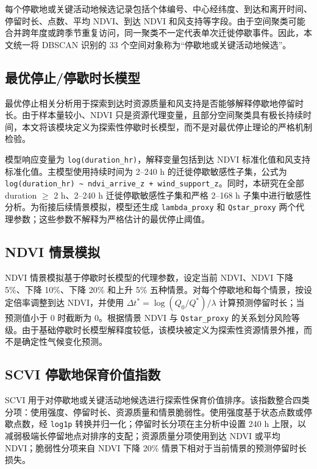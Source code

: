 \documentclass[UTF8,a4paper,12pt]{ctexart}
\begin{document}
每个停歇地或关键活动地候选记录包括个体编号、中心经纬度、到达和离开时间、停留时长、点数、平均 NDVI、到达 NDVI 和风支持等字段。由于空间聚类可能合并跨年度或跨季节重复访问，同一聚类不一定代表单次迁徙停歇事件。因此，本文统一将 DBSCAN 识别的 33 个空间对象称为“停歇地或关键活动地候选”。

\subsection{最优停止/停歇时长模型}

最优停止相关分析用于探索到达时资源质量和风支持是否能够解释停歇地停留时长。由于样本量较小、NDVI 只是资源代理变量，且部分空间聚类具有极长持续时间，本文将该模块定义为探索性停歇时长模型，而不是对最优停止理论的严格机制检验。

模型响应变量为 \texttt{log(duration\_hr)}，解释变量包括到达 NDVI 标准化值和风支持标准化值。主模型使用持续时间为 2--240 h 的迁徙停歇敏感性子集，公式为 \texttt{log(duration\_hr) \textasciitilde{} ndvi\_arrive\_z + wind\_support\_z}。同时，本研究在全部 duration $\geq$ 2 h、2--240 h 迁徙停歇敏感性子集和严格 2--168 h 子集中进行敏感性分析。为衔接后续情景模拟，模型还生成 \texttt{lambda\_proxy} 和 \texttt{Qstar\_proxy} 两个代理参数；这些参数不解释为严格估计的最优停止阈值。

\subsection{NDVI 情景模拟}

NDVI 情景模拟基于停歇时长模型的代理参数，设定当前 NDVI、NDVI 下降 5\%、下降 10\%、下降 20\% 和上升 5\% 五种情景。对每个停歇地和每个情景，按设定倍率调整到达 NDVI，并使用 $\Delta t^{*} = \log(Q_0 / Q^{*}) / \lambda$ 计算预测停留时长；当预测值小于 0 时截断为 0。根据情景 NDVI 与 \texttt{Qstar\_proxy} 的关系划分风险等级。由于基础停歇时长模型解释度较低，该模块被定义为探索性资源情景外推，而不是确定性气候变化预测。

\subsection{SCVI 停歇地保育价值指数}

SCVI 用于对停歇地或关键活动地候选进行探索性保育价值排序。该指数整合四类分项：使用强度、停留时长、资源质量和情景脆弱性。使用强度基于状态点数或停歇点数，经 \texttt{log1p} 转换并归一化；停留时长分项在主分析中设置 240 h 上限，以减弱极端长停留地点对排序的支配；资源质量分项使用到达 NDVI 或平均 NDVI；脆弱性分项来自 NDVI 下降 20\% 情景下相对于当前情景的预测停留时长损失。
\end{document}
